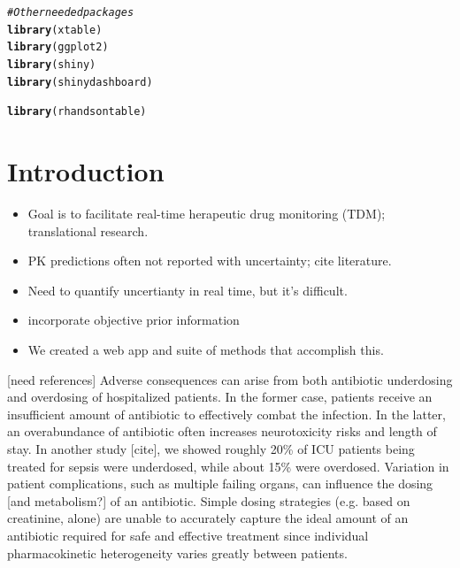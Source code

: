 \documentclass{article}\usepackage[]{graphicx}\usepackage[]{color}
\makeatletter
\newcommand{\hlcom}[1]{\textcolor[rgb]{0.678,0.584,0.686}{\textit{#1}}}%
\newcommand{\hlstd}[1]{\textcolor[rgb]{0.345,0.345,0.345}{#1}}%
\newcommand{\hlkwd}[1]{\textcolor[rgb]{0.737,0.353,0.396}{\textbf{#1}}}%
\newenvironment{kframe}{%
 \def\at@end@of@kframe{}%
 \ifinner\ifhmode%
  \def\at@end@of@kframe{\end{minipage}}%
  \begin{minipage}{\columnwidth}%
 \fi\fi%
 \def\FrameCommand##1{\hskip\@totalleftmargin \hskip-\fboxsep
 \colorbox{shadecolor}{##1}\hskip-\fboxsep
     \hskip-\linewidth \hskip-\@totalleftmargin \hskip\columnwidth}%
 \MakeFramed {\advance\hsize-\width
   \@totalleftmargin\z@ \linewidth\hsize
   \@setminipage}}%
 {\par\unskip\endMakeFramed%
 \at@end@of@kframe}
\newenvironment{knitrout}{}{} %
\makeatother
\begin{document}
\begin{knitrout}
\color{fgcolor}\begin{kframe}
\begin{alltt}
\hlcom{# Other needed packages}
\hlkwd{library}\hlstd{(xtable)}
\hlkwd{library}\hlstd{(ggplot2)}
\hlkwd{library}\hlstd{(shiny)}
\hlkwd{library}\hlstd{(shinydashboard)}
\end{alltt}


{\ttfamily\noindent\itshape\color{messagecolor}{\#\# \\\#\# Attaching package: 'shinydashboard'}}

{\ttfamily\noindent\itshape\color{messagecolor}{\#\# The following object is masked from 'package:graphics':\\\#\# \\\#\#\ \ \ \  box}}\begin{alltt}
\hlkwd{library}\hlstd{(rhandsontable)}
\end{alltt}
\end{kframe}
\end{knitrout}



\section{Introduction}
\begin{itemize}
\item Goal is to facilitate real-time herapeutic drug monitoring (TDM); translational research.
\item PK predictions often not reported with uncertainty; cite literature.
\item Need to quantify uncertianty in real time, but it's difficult.
\item incorporate objective prior information
\item We created a web app and suite of methods that accomplish this.
\end{itemize}

[need references]
Adverse consequences can arise from both antibiotic underdosing and overdosing  of hospitalized patients. In the former case, patients receive an insufficient amount of antibiotic to effectively combat the infection. In the latter, an overabundance of antibiotic often increases neurotoxicity risks and length of stay. In another study [cite], we showed roughly 20\% of ICU patients being treated for sepsis were underdosed, while about 15\% were overdosed.  Variation in patient complications, such as multiple failing organs, can influence the dosing [and metabolism?] of an antibiotic. Simple dosing strategies (e.g. based on creatinine, alone) are unable to accurately capture the ideal amount of an antibiotic required for safe and effective treatment since individual pharmacokinetic heterogeneity varies greatly between patients.\\
\end{document}

